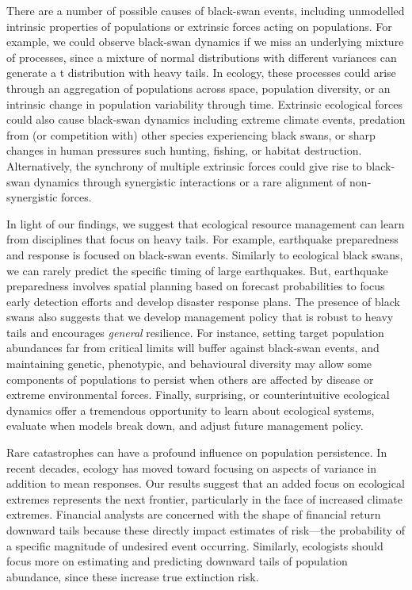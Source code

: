 There are a number of possible causes of black-swan events, including unmodelled intrinsic properties of populations or extrinsic forces acting on populations. For example, we could observe black-swan dynamics if we miss an underlying mixture of processes, since a mixture of normal distributions with different variances can generate a t distribution with heavy tails\cite{allen2001}. In ecology, these processes could arise through an aggregation of populations across space, population diversity\cite{schindler2010}, or an intrinsic change in population variability through time\cite{carpenter2006}. Extrinsic ecological forces could also cause black-swan dynamics\cite{nunez2012} including extreme climate events\cite{meehl2004, katz2005, ipcc2012}, predation from (or competition with) other species experiencing black swans, or sharp changes in human pressures such hunting, fishing, or habitat destruction. Alternatively, the synchrony of multiple extrinsic forces could give rise to black-swan dynamics through synergistic interactions\cite{kirby2009} or a rare alignment of non-synergistic forces\cite{denny2009}.

In light of our findings, we suggest that ecological resource management can learn from disciplines that focus on heavy tails. For example, earthquake preparedness and response is focused on black-swan events. Similarly to ecological black swans, we can rarely predict the specific timing of large earthquakes. But, earthquake preparedness involves spatial planning based on forecast probabilities to focus early detection efforts and develop disaster response plans\cite{nrc2007}. The presence of black swans also suggests that we develop management policy that is robust to heavy tails and encourages \textit{general} resilience\cite{carpenter2012}. For instance, setting target population abundances far from critical limits will buffer against black-swan events\cite{caddy1996}, and maintaining genetic, phenotypic, and behavioural diversity may allow some components of populations to persist when others are affected by disease or extreme environmental forces\cite{schindler2010}. Finally, surprising, or counterintuitive ecological dynamics offer a tremendous opportunity to learn about ecological systems, evaluate when models break down, and adjust future management policy\cite{doak2008, lindenmayer2010}.

Rare catastrophes can have a profound influence on population persistence\cite{mangel1994}. In recent decades, ecology has moved toward focusing on aspects of variance in addition to mean responses\cite{thompson2013}. Our results suggest that an added focus on ecological extremes represents the next frontier, particularly in the face of increased climate extremes\cite{meehl2004, ipcc2012, thompson2013}. Financial analysts are concerned with the shape of financial return downward tails because these directly impact estimates of risk---the probability of a specific magnitude of undesired event occurring. Similarly, ecologists should focus more on estimating and predicting downward tails of population abundance, since these increase true extinction risk.

